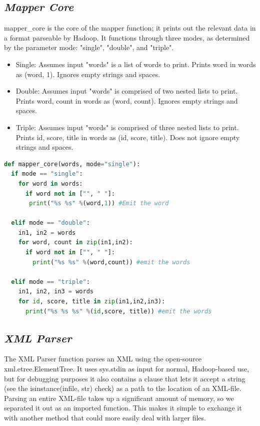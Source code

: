 \documentclass[fleqn,10pt]{wlscirep}
\begin{document}
\subsection{\emph{Mapper Core}}
mapper\_core is the core of the mapper function; it prints out the relevant data in a format parseable by Hadoop. It functions through three modes, as determined by the parameter mode: "single", "double", and "triple".

\begin{itemize}
 \item Single: Assumes input "words" is a list of words to print. Prints word in words as (word, 1). Ignores empty strings and spaces.
 \item Double: Assumes input "words" is comprised of two nested lists to print. Prints word, count in words as (word, count). Ignores empty strings and spaces.
 \item Triple: Assumes input "words" is comprised of three nested lists to print. Prints id, score, title in words as (id, score, title). Does not ignore empty strings and spaces.
\end{itemize}

\begin{lstlisting}[language=Python, caption=mapper\_core function]
def mapper_core(words, mode="single"):
  if mode == "single":
    for word in words:
      if word not in ["", " "]:
       print("%s %s" %(word,1)) #Emit the word

  elif mode == "double":
    in1, in2 = words
    for word, count in zip(in1,in2):
      if word not in ["", " "]:
        print("%s %s" %(word,count)) #emit the words

  elif mode == "triple":
    in1, in2, in3 = words
    for id, score, title in zip(in1,in2,in3):
      print("%s %s %s" %(id,score, title)) #emit the words

\end{lstlisting}

\subsection{\emph{XML Parser}}
The XML Parser function parses an XML using the open-source xml.etree.ElementTree. It uses sys.stdin as input for normal, Hadoop-based use, but for debugging purposes it also contains a clause that lets it accept a string (see the isinstance(infile, str) check) as a path to the location of an XML-file.\\
Parsing an entire XML-file takes up a significant amount of memory, so we separated it out as an imported function. This makes it simple to exchange it with another method that could more easily deal with larger files. 
\end{document}

